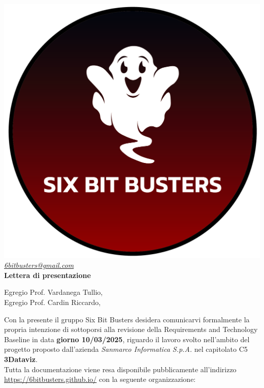 \thispagestyle{empty}
\renewcommand{\arraystretch}{1.0}


\begin{titlepage}
	\begin{center}
	\includegraphics[scale = 0.5]{template/images/logo-circle.png}
	\\[1cm]
	\href{mailto:6bitbusters@gmail.com}		      	
	{\large{\textit{6bitbusters@gmail.com} } }\\[1cm]
	
	{\Huge{ \textbf{Lettera di presentazione} } }\\[1cm]
        \end{center}
        Egregio Prof. Vardanega Tullio, \\
        Egregio Prof. Cardin Riccardo,
        \newline

        Con la presente il gruppo Six Bit Busters desidera comunicarvi formalmente la propria
        intenzione di sottoporsi alla revisione della Requirements and Technology Baseline in data \textbf{giorno 10/03/2025}, riguardo il lavoro svolto nell'ambito del progetto proposto dall'azienda \textit{Sanmarco Informatica S.p.A.}
        nel capitolato C5 \textbf{3Dataviz}.\\

        Tutta la documentazione viene resa disponibile pubblicamente all'indirizzo \url{https://6bitbusters.github.io/} con la
        seguente organizzazione:


\end{titlepage}
